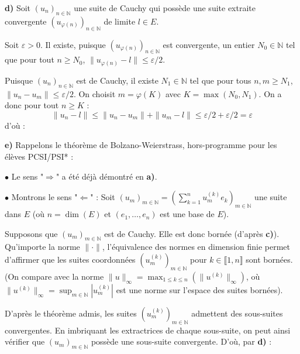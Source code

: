 \documentclass[11pt,a4paper]{article}
\begin{document}
\vspace{0.5cm}

\noindent \textbf{d)} Soit $(u_n)_{n \in \mathbb{N}}$ une suite de Cauchy qui possède une suite extraite convergente $(u_{\varphi(n)})_{n \in \mathbb{N}}$ de limite $l \in E$.

\noindent Soit $\varepsilon > 0$. Il existe, puisque $(u_{\varphi(n)})_{n \in \mathbb{N}}$ est convergente, un entier $N_0 \in \mathbb{N}$ tel que pour tout $n \geqslant N_0$, $\|u_{\varphi(n)} - l\| \leqslant \varepsilon/2$.

\noindent Puisque $(u_n)_{n \in \mathbb{N}}$ est de Cauchy, il existe $N_1 \in \mathbb{N}$ tel que pour tous $n,m \geqslant N_1$, $\|u_n - u_m\| \leqslant \varepsilon/2$. On choisit $m = \varphi(K)$ avec $K = \max(N_0,N_1)$. On a donc pour tout $n \geqslant K$ :
$$ \|u_n - l\| \leqslant \|u_n - u_m\| + \|u_m - l\| \leqslant \varepsilon/2 + \varepsilon/2 = \varepsilon $$
\noindent d'où :
\begin{center}
\end{center}

\vspace{0.5cm}

\noindent \textbf{e)} Rappelons le théorème de Bolzano-Weierstrass, hors-programme pour les élèves PCSI/PSI* :
\begin{center}
\end{center}

\noindent $\bullet$ Le sens "$\Rightarrow$" a été déjà démontré en \textbf{a)}.

\noindent $\bullet$ Montrons le sens "$\Leftarrow$" : Soit $(u_m)_{m \in \mathbb{N}} = \left( \sum_{k=1}^n u_m^{(k)} e_k \right)_{m \in \mathbb{N}}$ une suite dans $E$ (où $n = \dim(E)$ et $(e_1, \ldots, e_n)$ est une base de $E$).

\noindent Supposons que $(u_m)_{m \in \mathbb{N}}$ est de Cauchy. Elle est donc bornée (d'après \textbf{c)}). Qu'importe la norme $\|\cdot\|$, l'équivalence des normes en dimension finie permet d'affirmer que les suites coordonnées $(u_m^{(k)})_{m \in \mathbb{N}}$ pour $k \in \llbracket 1, n \rrbracket$ sont bornées. (On compare avec la norme $\|u\|_\infty = \max_{1 \leqslant k \leqslant n} (\|u^{(k)}\|_\infty)$, où $\|u^{(k)}\|_\infty = \sup_{m \in \mathbb{N}} |u_m^{(k)}|$ est une norme sur l'espace des suites bornées).

\noindent D'après le théorème admis, les suites $(u_m^{(k)})_{m \in \mathbb{N}}$ admettent des sous-suites convergentes. En imbriquant les extractrices de chaque sous-suite, on peut ainsi vérifier que $(u_m)_{m \in \mathbb{N}}$ possède une sous-suite convergente. D'où, par \textbf{d)} :
\begin{center}
\end{center} 
\end{document}
